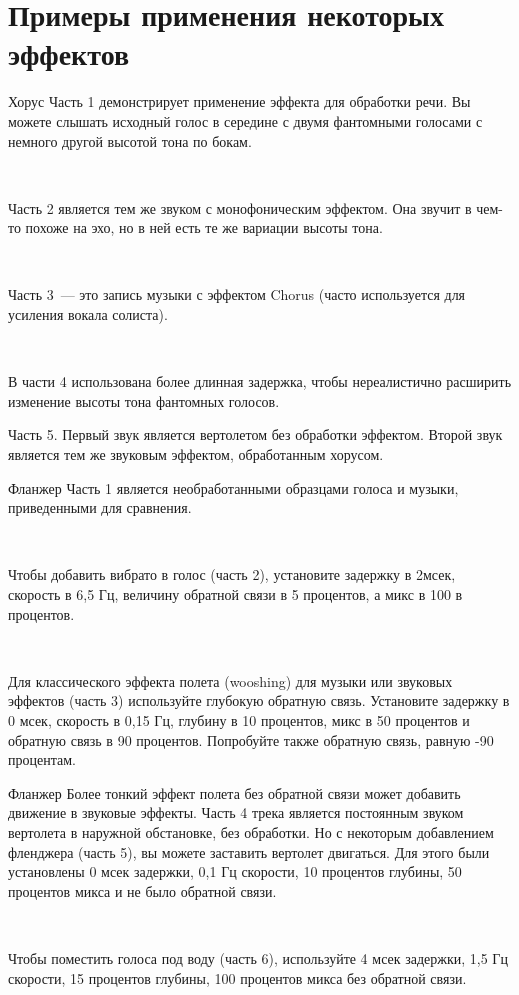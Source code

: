 \documentclass{beamer}
\begin{document}
\section{Примеры применения некоторых эффектов}
\begin{frame}
  \begin{block}{Хорус}
     Часть 1 демонстрирует применение эффекта для обработки речи. Вы можете слышать исходный голос в середине с двумя фантомными голосами с немного другой высотой тона по бокам. 

     ~

     Часть 2 является тем же звуком с монофоническим эффектом. Она звучит в чем-то похоже на эхо, но в ней есть те же вариации высоты тона. 

~

     Часть 3~--- это запись музыки с эффектом Chorus (часто используется для усиления вокала солиста). 

~

     В части 4 использована более длинная задержка, чтобы нереалистично расширить изменение высоты тона фантомных голосов.

    Часть 5. Первый звук является вертолетом без обработки эффектом. Второй звук является тем же звуковым эффектом, обработанным хорусом.
  \end{block}  
\end{frame}
\begin{frame}
  \begin{block}{Фланжер}
     Часть 1 является необработанными образцами голоса и музыки, приведенными для сравнения.

~

Чтобы добавить вибрато в голос (часть 2), установите задержку в 2мсек, скорость в 6,5 Гц, величину обратной связи в 5 процентов, а микс в 100 в процентов.

~

Для классического эффекта полета (wooshing) для музыки или звуковых эффектов (часть 3) используйте глубокую обратную связь. Установите задержку в 0 мсек, скорость в 0,15 Гц, глубину в 10 процентов, микс в 50 процентов и обратную связь в 90 процентов. Попробуйте также обратную связь, равную -90 процентам.
  \end{block}  
\end{frame}

\begin{frame}
  \begin{block}{Фланжер}
Более тонкий эффект полета без обратной связи может добавить движение в звуковые эффекты. Часть 4 трека является постоянным звуком вертолета в наружной обстановке, без обработки. Но с некоторым добавлением фленджера (часть 5), вы можете заставить вертолет двигаться. Для этого были установлены 0 мсек задержки, 0,1 Гц скорости, 10 процентов глубины, 50 процентов микса и не было обратной связи.

~

Чтобы поместить голоса под воду (часть 6), используйте 4 мсек задержки, 1,5 Гц скорости, 15 процентов глубины, 100 процентов микса без обратной связи.  
  \end{block}  
\end{frame}
\end{document}
